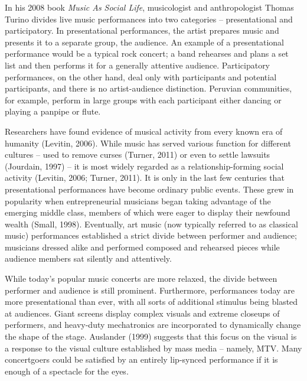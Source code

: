 In his 2008 book \textit{Music As Social Life}, musicologist and anthropologist Thomas Turino divides live music performances into two categories -- presentational and participatory. In presentational performances, the artist prepares music and presents it to a separate group, the audience. An example of a presentational performance would be a typical rock concert; a band rehearses and plans a set list and then performs it for a generally attentive audience. Participatory performances, on the other hand, deal only with participants and potential participants, and there is no artist-audience distinction. Peruvian communities, for example, perform in large groups with each participant either dancing or playing a panpipe or flute.

Researchers have found evidence of musical activity from every known era of humanity (Levitin, 2006). While music has served various function for different cultures -- used to remove curses (Turner, 2011) or even to settle lawsuits (Jourdain, 1997) -- it is most widely regarded as a relationship-forming social activity (Levitin, 2006; Turner, 2011). It is only in the last few centuries that presentational performances have become ordinary public events. These grew in popularity when entrepreneurial musicians began taking advantage of the emerging middle class, members of which were eager to display their newfound wealth (Small, 1998). Eventually, art music (now typically referred to as classical music) performances established a strict divide between performer and audience; musicians dressed alike and performed composed and rehearsed pieces while audience members sat silently and attentively.

While today's popular music concerts are more relaxed, the divide between performer and audience is still prominent. Furthermore, performances today are more presentational than ever, with all sorts of additional stimulus being blasted at audiences. Giant screens display complex visuals and extreme closeups of performers, and heavy-duty mechatronics are incorporated to dynamically change the shape of the stage. Auslander (1999) suggests that this focus on the visual is a response to the visual culture established by mass media -- namely, MTV. Many concertgoers could be satisfied by an entirely lip-synced performance if it is enough of a spectacle for the eyes.

